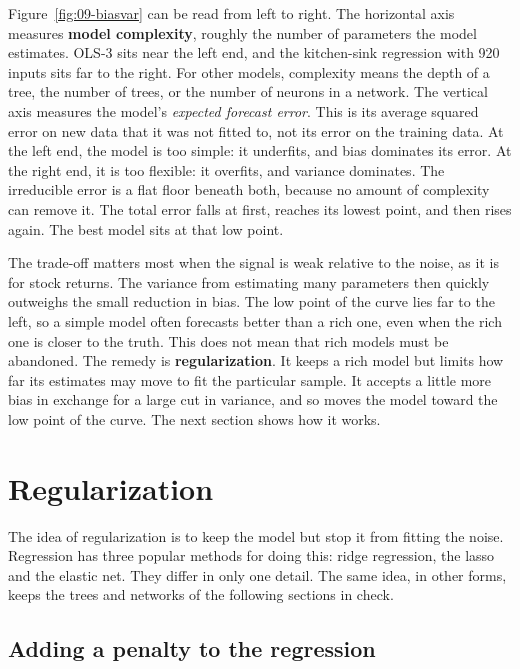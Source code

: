 Figure~\ref{fig:09-biasvar} can be read from left to right. The horizontal axis measures \textbf{model complexity}, roughly the number of parameters the model estimates. OLS-3 sits near the left end, and the kitchen-sink regression with 920 inputs sits far to the right. For other models, complexity means the depth of a tree, the number of trees, or the number of neurons in a network. The vertical axis measures the model's \emph{expected forecast error}. This is its average squared error on new data that it was not fitted to, not its error on the training data. At the left end, the model is too simple: it underfits, and bias dominates its error. At the right end, it is too flexible: it overfits, and variance dominates. The irreducible error is a flat floor beneath both, because no amount of complexity can remove it. The total error falls at first, reaches its lowest point, and then rises again. The best model sits at that low point.

The trade-off matters most when the signal is weak relative to the noise, as it is for stock returns. The variance from estimating many parameters then quickly outweighs the small reduction in bias. The low point of the curve lies far to the left, so a simple model often forecasts better than a rich one, even when the rich one is closer to the truth. This does not mean that rich models must be abandoned. The remedy is \textbf{regularization}. It keeps a rich model but limits how far its estimates may move to fit the particular sample. It accepts a little more bias in exchange for a large cut in variance, and so moves the model toward the low point of the curve. The next section shows how it works.

\section{Regularization}
\label{sec:20-models}
\label{sec:20-shrinkage}

The idea of regularization is to keep the model but stop it from fitting the noise. Regression has three popular methods for doing this: ridge regression, the lasso and the elastic net. They differ in only one detail. The same idea, in other forms, keeps the trees and networks of the following sections in check.

\subsection{Adding a penalty to the regression}

